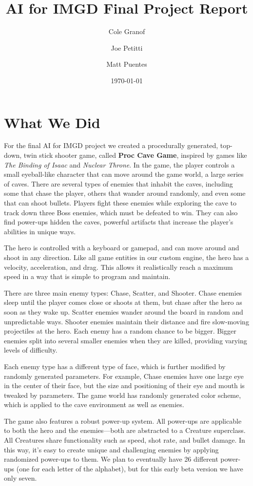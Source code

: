 \documentclass[a4paper, 12pt]{article}
\title{AI for IMGD Final Project Report}
\author{Cole Granof \and Joe Petitti \and Matt Puentes}
\date{\today}
\begin{document}
\maketitle

\section{What We Did}

For the final AI for IMGD project we created a procedurally generated, top-down,
twin stick shooter game, called \textbf{Proc Cave Game}, inspired by games like
\textit{The Binding of Isaac} and \textit{Nuclear Throne}. In the game, the
player controls a small eyeball-like character that can move around the game
world, a large series of caves. There are several types of enemies that inhabit
the caves, including some that chase the player, others that wander around
randomly, and even some that can shoot bullets. Players fight these enemies
while exploring the cave to track down three Boss enemies, which must be
defeated to win. They can also find power-ups hidden the caves, powerful
artifacts that increase the player's abilities in unique ways.

The hero is controlled with a keyboard or gamepad, and can move around and shoot
in any direction. Like all game entities in our custom engine, the hero has a
velocity, acceleration, and drag. This allows it realistically reach a maximum
speed in a way that is simple to program and maintain.

There are three main enemy types: Chase, Scatter, and Shooter. Chase enemies
sleep until the player comes close or shoots at them, but chase after the hero
as soon as they wake up. Scatter enemies wander around the board in random and
unpredictable ways. Shooter enemies maintain their distance and fire slow-moving
projectiles at the hero. Each enemy has a random chance to be bigger. Bigger
enemies split into several smaller enemies when they are killed, providing
varying levels of difficulty.

Each enemy type has a different type of face, which is further modified by
randomly generated parameters. For example, Chase enemies have one large eye in
the center of their face, but the size and positioning of their eye and mouth is
tweaked by parameters. The game world has randomly generated color scheme, which
is applied to the cave environment as well as enemies.

The game also features a robust power-up system. All power-ups are applicable to
both the hero and the enemies---both are abstracted to a Creature superclass.
All Creatures share functionality such as speed, shot rate, and bullet damage.
In this way, it's easy to create unique and challenging enemies by applying
randomized power-ups to them. We plan to eventually have 26 different power-ups
(one for each letter of the alphabet), but for this early beta version we have
only seven.
\end{document}
